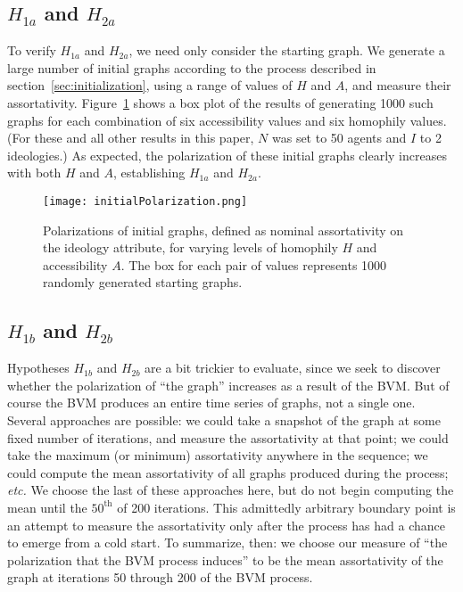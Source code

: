 
\subsection{$H_{1a}$ and $H_{2a}$}

To verify $H_{1a}$ and $H_{2a}$, we need only consider the starting graph. We
generate a large number of initial graphs according to the process described
in section~\ref{sec:initialization}, using a range of values of $H$ and $A$,
and measure their assortativity. Figure~\ref{fig:initialPolarization} shows a
box plot of the results of generating 1000 such graphs for each combination of
six accessibility values and six homophily values. (For these and all other
results in this paper, $N$ was set to 50 agents and $I$ to 2 ideologies.) As
expected, the polarization of these initial graphs clearly increases with both
$H$ and $A$, establishing $H_{1a}$ and $H_{2a}$.

\begin{figure}
\centering
\texttt{[image: initialPolarization.png]}
\caption{Polarizations of initial graphs, defined as nominal assortativity on
the ideology attribute, for varying levels of homophily $H$ and accessibility
$A$. The box for each pair of values represents 1000 randomly generated
starting graphs.}
\label{fig:initialPolarization}
\end{figure}

\subsection{$H_{1b}$ and $H_{2b}$}

Hypotheses $H_{1b}$ and $H_{2b}$ are a bit trickier to evaluate, since we seek
to discover whether the polarization of ``the graph'' increases as a result of
the BVM. But of course the BVM produces an entire time series of graphs, not a
single one. Several approaches are possible: we could take a snapshot of the
graph at some fixed number of iterations, and measure the assortativity at
that point; we could take the maximum (or minimum) assortativity anywhere in
the sequence; we could compute the mean assortativity of all graphs produced
during the process; \textit{etc.} We choose the last of these approaches here,
but do not begin computing the mean until the $50^{\text{th}}$ of 200
iterations. This admittedly arbitrary boundary point is an attempt to measure
the assortativity only after the process has had a chance to emerge from a
cold start. To summarize, then: we choose our measure of ``the polarization
that the BVM process induces'' to be the mean assortativity of the graph at
iterations 50 through 200 of the BVM process.

